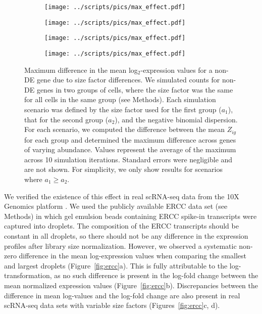 \documentclass[10pt,letterpaper]{article}
\begin{document}
\begin{figure}[btp]
\centering
\begin{subfigure}[b]{0.49\textwidth}
    \texttt{[image: ../scripts/pics/max\_effect.pdf]}
    \caption{}
\end{subfigure}
\begin{subfigure}[b]{0.49\textwidth}
    \texttt{[image: ../scripts/pics/max\_effect.pdf]}
    \caption{}
\end{subfigure}
\begin{subfigure}[b]{0.49\textwidth}
    \texttt{[image: ../scripts/pics/max\_effect.pdf]}
    \caption{}
\end{subfigure}
\begin{subfigure}[b]{0.49\textwidth}
    \texttt{[image: ../scripts/pics/max\_effect.pdf]}
    \caption{}
\end{subfigure}
\caption{Maximum difference in the mean log$_2$-expression values for a non-DE gene due to size factor differences.
We simulated counts for non-DE genes in two groups of cells, where the size factor was the same for all cells in the same group (see Methods).
Each simulation scenario was defined by the size factor used for the first group ($a_1$), that for the second group ($a_2$), and the negative binomial dispersion.
For each scenario, we computed the difference between the mean $Z_{ig}$ for each group and determined the maximum difference across genes of varying abundance.
Values represent the average of the maximum across 10 simulation iterations.
Standard errors were negligible and are not shown.
For simplicity, we only show results for scenarios where $a_1 \ge a_2$.
}
\label{fig:maxeffect}
\end{figure}

We verified the existence of this effect in real scRNA-seq data from the 10X Genomics platform \cite{zheng2017massively}.
We used the publicly available ERCC data set (see Methods) in which gel emulsion beads containing ERCC spike-in transcripts were captured into droplets.
The composition of the ERCC transcripts should be constant in all droplets, so there should not be any difference in the expression profiles after library size normalization.
However, we observed a systematic non-zero difference in the mean log-expression values when comparing the smallest and largest droplets (Figure~\ref{fig:ercc}a).
This is fully attributable to the log-transformation, as no such difference is present in the log-fold change between the mean normalized expression values (Figure~\ref{fig:ercc}b).
Discrepancies between the difference in mean log-values and the log-fold change are also present in real scRNA-seq data sets with variable size factors (Figures~\ref{fig:ercc}c, d).
\end{document}
